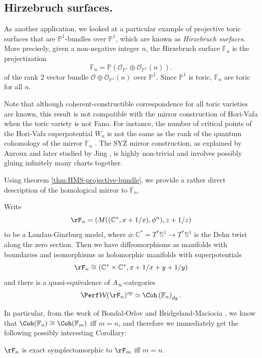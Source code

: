 \subsection{Hirzebruch surfaces.} As another application, we looked at a particular example of projective toric surfaces that are $\mathbb{P}^1$-bundles over $\mathbb{P}^1$, which are known as \emph{Hirzebruch surfaces}. More precisely, given a non-negative integer $n$, the Hirzebruch surface $\mathbb{F}_n$ is the projectization \[
    \mathbb{F}_n =\mathbb{P}\left(\mathcal{O}_{\mathbb{P}^1}\oplus\mathcal{O}_{\mathbb{P}^1}(n)\right).
\]of the rank $2$ vector bundle $\mathcal{O}\oplus\mathcal{O}_{\mathbb{P}^1} (n)$ over $\mathbb{P}^1$. Since $\mathbb{P}^1$ is toric, $\mathbb{F}_n$ are toric for all $n$.\par
Note that although coherent-constructible correspondence for all toric varieties are known, this result is not compatible with the mirror construction of Hori-Vafa \cite{HV00} when the toric variety is not Fano. For instance, the number of critical points of the Hori-Vafa superpotential $W_n$ is not the same as the rank of the quantum cohomology of the mirror $\mathbb{F}_n$ \cite[Example 8.2]{FOOO10}. The SYZ mirror construction, as explained by Auroux \cite{Auroux09} and later studied by Jing \cite{Jing26}, is highly non-trivial and involves possibly gluing infinitely many charts together.\par
Using theorem \ref{thm:HMS-projective-bundle}, we provide a rather direct description of the homological mirror to $\mathbb{F}_n$.
\begin{crl}\label{crl:mirror-to-Hirzebruch}
    Write \[
        \rF_n =\left(M((\mathbb{C}^{\ast}, x+1/x),\phi^n),z+1/z\right)
    \]to be a Landau-Ginzburg model, where $\phi\colon\mathbb{C}^{\ast}=T^{\ast}\mathbb{S}^1\to T^{\ast}\mathbb{S}^1$ is the Dehn twist along the zero section. Then we have diffeomorphisms as manifolds with boundaries and isomorphisms as holomorphic manifolds with superpotentials\[
        \rF_n\cong\left(\mathbb{C}^{\ast}\times\mathbb{C}^{\ast}, x+1/x+y+1/y\right)
    \]and there is a quasi-equivalence of $A_{\infty}$-categories \[
        \Perf\mathcal{W} (\rF_n)^{op}\simeq\Coh\left(\mathbb{F}_n\right)_{dg}.
    \]
\end{crl}
In particular, from the work of Bondal-Orlov \cite{BO01} and Bridgeland-Maciocia \cite{BM01}, we know that $\Coh (\mathbb{F}_n)\cong\Coh (\mathbb{F}_m)$ iff $m=n$, and therefore we immediately get the following possibly interesting Corollary:
\begin{crl}\label{crl:exotic-Weinstein-structure}
    $\rF_n$ is exact symplectomorphic to $\rF_m$ iff $m=n$.
\end{crl}
